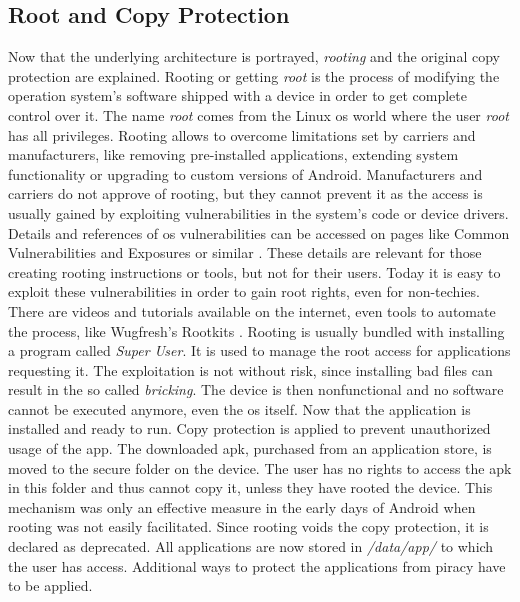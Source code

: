 \subsection{Root and Copy Protection} \label{subsection:android-copyroot}
Now that the underlying architecture is portrayed, \textit{rooting} and the original copy protection are explained.
Rooting or getting \textit{root} is the process of modifying the operation system's software shipped with a device in order to get complete control over it.
The name \textit{root} comes from the Linux \gls{os} world where the user \textit{root} has all privileges.
Rooting allows to overcome limitations set by carriers and manufacturers, like removing pre-installed applications, extending system functionality or upgrading to custom versions of Android.
Manufacturers and carriers do not approve of rooting, but they cannot prevent it as the access is usually gained by exploiting vulnerabilities in the system's code or device drivers.
Details and references of \gls{os} vulnerabilities can be accessed on pages like Common Vulnerabilities and Exposures or similar \cite{cveAndroidPriv} \cite{cveDetails}.
These details are relevant for those creating rooting instructions or tools, but not for their users.
\newline
Today it is easy to exploit these vulnerabilities in order to gain root rights, even for non-techies.
There are videos and tutorials available on the internet, even tools to automate the process, like Wugfresh's Rootkits \cite{wugfresh}.
Rooting is usually bundled with installing a program called \textit{Super User}.
It is used to manage the root access for applications requesting it.
The exploitation is not without risk, since installing bad files can result in the so called \textit{bricking}.
The device is then nonfunctional and no software cannot be executed anymore, even the \gls{os} itself.
 \cite{androidpoliceRoot}
\newline
Now that the application is installed and ready to run.
Copy protection is applied to prevent unauthorized usage of the app.
The downloaded \gls{apk}, purchased from an application store, is moved to the secure folder on the device.
The user has no rights to access the \gls{apk} in this folder and thus cannot copy it, unless they have rooted the device.
This mechanism was only an effective measure in the early days of Android when rooting was not easily facilitated.
\newline
Since rooting voids the copy protection, it is declared as deprecated.
All applications are now stored in \textit{/data/app/} to which the user has access.
Additional ways to protect the applications from piracy have to be applied.
